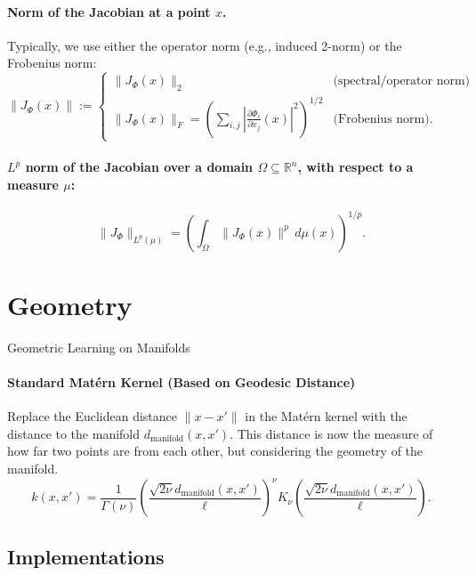 \documentclass{article}
\theoremstyle{definition} \newtheorem{definition}{Definition}  \newtheorem{example}{Example}
\theoremstyle{remark} \newtheorem{remark}{Remark}
\newcounter{ct}
\begin{document}
\paragraph{Norm of the Jacobian at a point \( x \).} Typically, we use either the operator norm (e.g., induced 2-norm) or the Frobenius norm:
\[
\|J_{\Phi}(x)\| :=
\begin{cases}
\|J_{\Phi}(x)\|_2 & \text{(spectral/operator norm)} \\
\|J_{\Phi}(x)\|_F = \left( \sum_{i,j} \left| \frac{\partial \Phi_i}{\partial x_j}(x) \right|^2 \right)^{1/2} & \text{(Frobenius norm)}.
\end{cases}
\]

\paragraph{\( L^p \) norm of the Jacobian over a domain \( \Omega \subseteq \mathbb{R}^n \), with respect to a measure \( \mu \):}
\[
\|J_{\Phi}\|_{L^p(\mu)} = \left( \int_{\Omega} \|J_{\Phi}(x)\|^p \, d\mu(x) \right)^{1/p}.
\]



\newpage
\section{Geometry}
Geometric Learning on Manifolds\citep{mostowsky2024geometrickernels}


\paragraph{Standard Matérn Kernel (Based on Geodesic Distance)}
Replace the Euclidean distance  $\| x - x' \|$  in the Matérn kernel with the distance to the manifold  $ d_{\text{manifold}}(x, x')$. 
This distance is now the measure of how far two points are from each other, but considering the geometry of the manifold.
\begin{equation}
k(x, x') = \frac{1}{\Gamma(\nu)} \left( \frac{\sqrt{2\nu} d_{\text{manifold}}(x, x')}{\ell} \right)^\nu K_\nu\left( \frac{\sqrt{2\nu} d_{\text{manifold}}(x, x')}{\ell} \right).
\end{equation}


\subsection{Implementations}
\citep{miolane2020geomstats}
\end{document}
